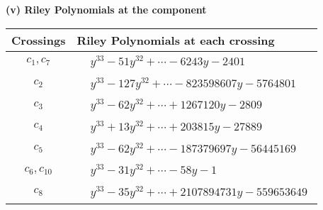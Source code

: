 \documentclass[1p]{elsarticle_modified}
\theoremstyle{definition}
\begin{document}
\newpage\renewcommand{\arraystretch}{1}
\flushleft \textbf{(v) Riley Polynomials at the component}\newline \\
\begin{tabular}{m{50pt}|m{274pt}}
Crossings & \hspace{64pt}Riley Polynomials at each crossing \\
\hline $$\begin{aligned}c_{1},c_{7}\end{aligned}$$&$\begin{aligned}
&y^{33}-51 y^{32}+\cdots-6243 y-2401
\end{aligned}$\\
\hline $$\begin{aligned}c_{2}\end{aligned}$$&$\begin{aligned}
&y^{33}-127 y^{32}+\cdots-823598607 y-5764801
\end{aligned}$\\
\hline $$\begin{aligned}c_{3}\end{aligned}$$&$\begin{aligned}
&y^{33}-62 y^{32}+\cdots+1267120 y-2809
\end{aligned}$\\
\hline $$\begin{aligned}c_{4}\end{aligned}$$&$\begin{aligned}
&y^{33}+13 y^{32}+\cdots+203815 y-27889
\end{aligned}$\\
\hline $$\begin{aligned}c_{5}\end{aligned}$$&$\begin{aligned}
&y^{33}-62 y^{32}+\cdots-187379697 y-56445169
\end{aligned}$\\
\hline $$\begin{aligned}c_{6},c_{10}\end{aligned}$$&$\begin{aligned}
&y^{33}-31 y^{32}+\cdots-58 y-1
\end{aligned}$\\
\hline $$\begin{aligned}c_{8}\end{aligned}$$&$\begin{aligned}
&y^{33}-35 y^{32}+\cdots+2107894731 y-559653649
\end{aligned}$\\

\end{tabular}
\end{document}

